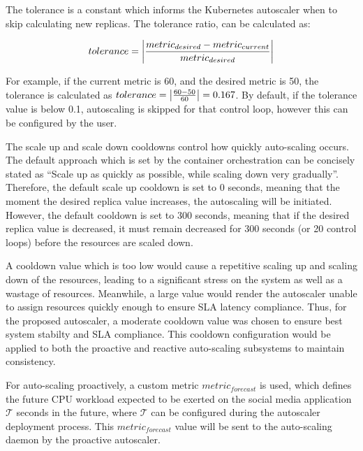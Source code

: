 The tolerance is a constant which informs the Kubernetes autoscaler when to skip calculating new replicas. The tolerance ratio, can be calculated as:

\begin{equation}
    \label{eqn:tolerance}
    tolerance = \abs{ \frac{metric_{desired} - metric_{current}}{metric_{desired}} }
\end{equation}

For example, if the current metric is 60, and the desired metric is 50, the tolerance is calculated as $ tolerance = \abs{ \frac{60 - 50}{60}} = 0.167$. By default, if the tolerance value is below 0.1, autoscaling is skipped for that control loop, however this can be configured by the user.\par

The scale up and scale down cooldowns control how quickly auto-scaling occurs. The default approach which is set by the container orchestration can be concisely stated as ``Scale up as quickly as possible, while scaling down very gradually''. Therefore, the default scale up cooldown is set to 0 seconds, meaning that the moment the desired replica value increases, the autoscaling will be initiated. However, the default cooldown is set to 300 seconds, meaning that if the desired replica value is decreased, it must remain decreased for 300 seconds (or 20 control loops) before the resources are scaled down.\par

A cooldown value which is too low would cause a repetitive scaling up and scaling down of the resources, leading to a significant stress on the system as well as a wastage of resources. Meanwhile, a large value would render the autoscaler unable to assign resources quickly enough to ensure SLA latency compliance. Thus, for the proposed autoscaler, a moderate cooldown value was chosen to ensure best system stabilty and SLA compliance. This cooldown configuration would be applied to both the proactive and reactive auto-scaling subsystems to maintain consistency.\par

For auto-scaling proactively, a custom metric $metric_{forecast}$ is used, which defines the future CPU workload expected to be exerted on the social media application $\mathcal{T}$ seconds in the future, where $\mathcal{T}$ can be configured during the autoscaler deployment process. This $metric_{forecast}$ value will be sent to the auto-scaling daemon by the proactive autoscaler.\par

